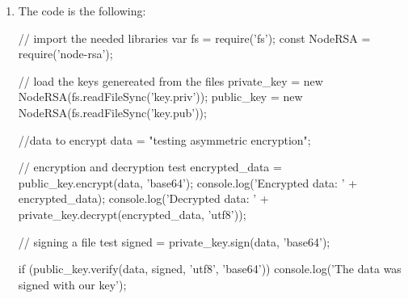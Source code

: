 \begin{Answer}[ref={basic-js-crypto-rsa}]
\begin{enumerate}[1.]
\item The code is the following: 

\begin{js}
// import the needed libraries
var fs = require('fs');
const NodeRSA = require('node-rsa');


// load the keys genereated from the files
private_key = new NodeRSA(fs.readFileSync('key.priv'));
public_key = new NodeRSA(fs.readFileSync('key.pub'));

//data to encrypt
data = "testing asymmetric encryption";

// encryption and decryption test
encrypted_data = public_key.encrypt(data, 'base64');
console.log('Encrypted data: ' + encrypted_data);
console.log('Decrypted data: ' + private_key.decrypt(encrypted_data, 'utf8'));

// signing a file test
signed = private_key.sign(data, 'base64');

if (public_key.verify(data, signed, 'utf8', 'base64')){
  console.log('The data was signed with our key');
}

\end{js}
\end{enumerate}
\end{Answer}
